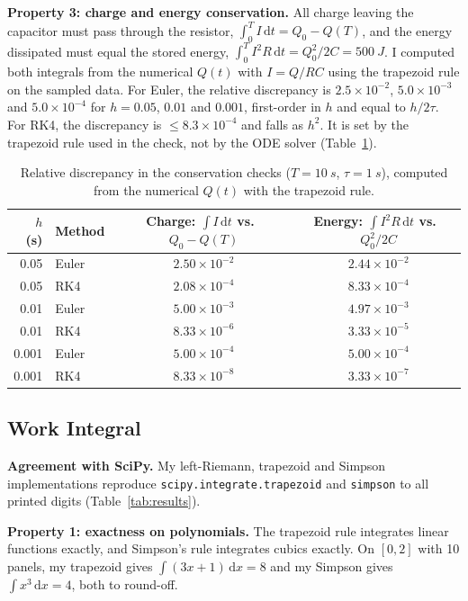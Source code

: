 \documentclass[11pt]{article}
\newcommand{\dd}{\mathrm{d}}
\begin{document}
\textbf{Property 3: charge and energy conservation.} All charge leaving the capacitor must pass through the resistor, $\int_0^T I\,\dd t = Q_0 - Q(T)$, and the energy dissipated must equal the stored energy, $\int_0^T I^2R\,\dd t = Q_0^2/2C = \SI{500}{J}$. I computed both integrals from the numerical $Q(t)$ with $I = Q/RC$ using the trapezoid rule on the sampled data. For Euler, the relative discrepancy is $2.5\times10^{-2}$, $5.0\times10^{-3}$ and $5.0\times10^{-4}$ for $h = 0.05$, $0.01$ and $0.001$, first-order in $h$ and equal to $h/2\tau$. For RK4, the discrepancy is $\le 8.3\times10^{-4}$ and falls as $h^2$. It is set by the trapezoid rule used in the check, not by the ODE solver (Table~\ref{tab:cons}).

\begin{table}[htbp]
  \centering
  \caption{Relative discrepancy in the conservation checks ($T = \SI{10}{s}$, $\tau = \SI{1}{s}$), computed from the numerical $Q(t)$ with the trapezoid rule.}
  \label{tab:cons}
  \begin{tabular}{r l c c}
    \toprule
    {$h$ (s)} & Method & Charge: $\int I\,\dd t$ vs.\ $Q_0 - Q(T)$ & Energy: $\int I^2R\,\dd t$ vs.\ $Q_0^2/2C$ \\
    \midrule
    0.05  & Euler & $2.50\times10^{-2}$ & $2.44\times10^{-2}$ \\
    0.05  & RK4   & $2.08\times10^{-4}$ & $8.33\times10^{-4}$ \\
    0.01  & Euler & $5.00\times10^{-3}$ & $4.97\times10^{-3}$ \\
    0.01  & RK4   & $8.33\times10^{-6}$ & $3.33\times10^{-5}$ \\
    0.001 & Euler & $5.00\times10^{-4}$ & $5.00\times10^{-4}$ \\
    0.001 & RK4   & $8.33\times10^{-8}$ & $3.33\times10^{-7}$ \\
    \bottomrule
  \end{tabular}
\end{table}

\subsection{Work Integral}

\textbf{Agreement with SciPy.} My left-Riemann, trapezoid and Simpson implementations reproduce \texttt{scipy.integrate.trapezoid} and \texttt{simpson} to all printed digits (Table~\ref{tab:results}).

\textbf{Property 1: exactness on polynomials.} The trapezoid rule integrates linear functions exactly, and Simpson's rule integrates cubics exactly. On $[0,2]$ with 10 panels, my trapezoid gives $\int(3x+1)\,\dd x = 8$ and my Simpson gives $\int x^3\,\dd x = 4$, both to round-off.
\end{document}
